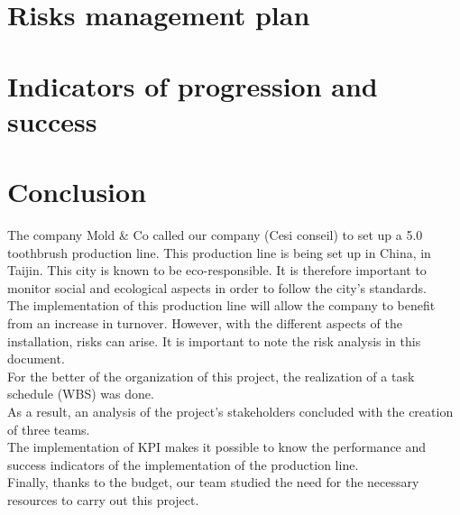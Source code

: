 \documentclass{article}
\begin{document}



\section{Risks management plan}
\label{risk-management}



\section{Indicators of progression and success}




\section{Conclusion} 

The company Mold & Co called our company (Cesi conseil) to set up a 5.0 toothbrush production line. This production line is being set up in China, in Taijin. This city is known to be eco-responsible. It is therefore important to monitor social and ecological aspects in order to follow the city's standards.\\

The implementation of this production line will allow the company to benefit from an increase in turnover. However, with the different aspects of the installation, risks can arise. It is important to note the risk analysis in this document.\\

For the better of the organization of this project, the realization of a task schedule (WBS) was done.\\
As a result, an analysis of the project's stakeholders concluded with the creation of three teams.\\

The implementation of KPI makes it possible to know the performance and success indicators of the implementation of the production line.\\

Finally, thanks to the budget, our team studied the need for the necessary resources to carry out this project.\\
\end{document}
